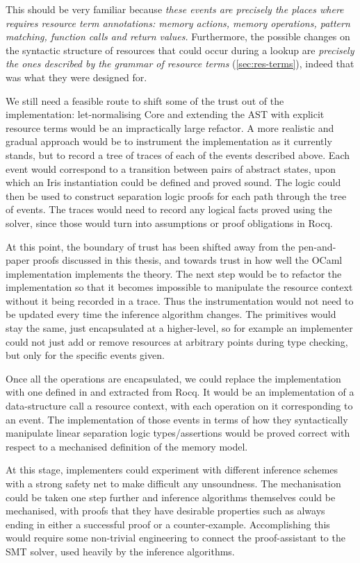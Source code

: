 This should be very familiar because \emph{these events are precisely the
places where  requires resource term annotations: memory actions,
memory operations, pattern matching, function calls and return values.}
Furthermore, the possible changes on the syntactic structure of resources that
could occur during a lookup are \emph{precisely the ones described by the
grammar of resource terms} (\cref{sec:res-terms}), indeed that was what they
were designed for.

We still need a feasible route to shift some of the trust out of the 
implementation: let-normalising Core and extending the AST with explicit
resource terms would be an impractically large refactor. A more realistic and
gradual approach would be to instrument the  implementation as it
currently stands, but to record a tree of traces of each of the events
described above. Each event would correspond to a transition between pairs of
 abstract states, upon which an Iris instantiation could be defined and
proved sound. The logic could then be used to construct separation logic proofs
for each path through the tree of events. The traces would need to record any
logical facts proved using the solver, since those would turn into assumptions
or proof obligations in Rocq.

At this point, the boundary of trust has been shifted away from the
pen-and-paper proofs discussed in this thesis, and towards trust in how well
the OCaml implementation implements the theory. The next step would be to
refactor the implementation so that it becomes impossible to manipulate the
resource context without it being recorded in a trace. Thus the
instrumentation would not need to be updated every time the inference algorithm
changes. The primitives would stay the same, just encapsulated at a
higher-level, so for example an implementer could not just add or remove
resources at arbitrary points during type checking, but only for the specific
events given.

Once all the operations are encapsulated, we could replace the implementation
with one defined in and extracted from Rocq. It would be an implementation of a
data-structure call a resource context, with each operation on it corresponding
to an event. The implementation of those events in terms of how they
syntactically manipulate linear separation logic types/assertions would be
proved correct with respect to a mechanised definition of the 
memory model.

At this stage,  implementers could experiment with different inference
schemes with a strong safety net to make difficult any unsoundness. The
mechanisation could be taken one step further and inference algorithms
themselves could be mechanised, with proofs that they have desirable properties
such as always ending in either a successful proof or a counter-example.
Accomplishing this would require some non-trivial engineering to connect the
proof-assistant to the SMT solver, used heavily by the inference algorithms.

